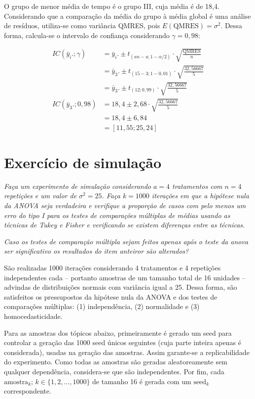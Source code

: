 \documentclass[
]{article}
\begin{document}
O grupo de menor média de tempo é o grupo III, cuja média é de 18,4.
Considerando que a comparação da média do grupo à média global é uma
análise de resíduos, utiliza-se como variância QMRES, pois
\(E\left(\text{QMRES}\right) = \sigma^2\). Dessa forma, calcula-se o
intervalo de confiança considerando \(\gamma = 0,98\):

\begin{align}
  IC\left( \bar{y}_i.; \gamma \right) &= \bar{y}_i. \pm t_{(an-a; 1-\alpha/2)} \cdot \sqrt{\frac{\text{QMRES}}{n}}\\
  &= \bar{y}_3. \pm t_{(15-3; 1-0,01)} \cdot \sqrt{\frac{32,56667}{5}}\\
  &= \bar{y}_3. \pm t_{(12; 0,99)} \cdot \sqrt{\frac{32,56667}{5}}\\
 IC\left( \bar{y}_3.; 0,98 \right) &= 18,4 \pm 2,68 \cdot \sqrt{\frac{32,56667}{5}}\\
  &= 18,4 \pm 6,84\\
  &= \left[ 11,55 ; 25,24 \right]
\end{align}

\hypertarget{exercuxedcio-de-simulauxe7uxe3o}{%
\section{Exercício de simulação}\label{exercuxedcio-de-simulauxe7uxe3o}}

\emph{Faça um experimento de simulação considerando \(a = 4\)
tratamentos com \(n = 4\) repetições e um valor de \(\sigma^2 = 25\).
Faça \(k = 1000\) iterações em que a hipótese nula da ANOVA seja
verdadeira e verifique a proporção de casos com pelo menos um erro do
tipo I para os testes de comparações múltiplas de médias usando as
técnicas de Tukey e Fisher e verificando se existem diferenças entre as
técnicas.}

\emph{Caso os testes de comparação múltipla sejam feitos apenas após o
teste da anova ser significativo os resultados do item anteiror são
alterados?}

São realizadas 1000 iterações considerando 4 tratamentos e 4 repetições
independentes cada -- portanto amostras de um tamanho total de 16
unidades -- advindas de distribuições normais com variância igual a 25.
Dessa forma, são satisfeitos os pressupostos da hipótese nula da ANOVA e
dos testes de comparações múltiplas: (1) independência, (2) normalidade
e (3) homocedasticidade.

Para as amostras dos tópicos abaixo, primeiramente é gerado um seed para
controlar a geração das 1000 seed únicos seguintes (cuja parte inteira
apenas é considerada), usadas na geração das amostras. Assim garante-se
a replicabilidade do experimento. Como todas as amostras são geradas
aleatoreamente sem qualquer dependência, considera-se que são
independentes. Por fim, cada
\(\text{amostra}_k; \, k \in \{1, 2, ..., 1000\}\) de tamanho 16 é
gerada com um \(\text{seed}_k\) correspondente.
\end{document}
